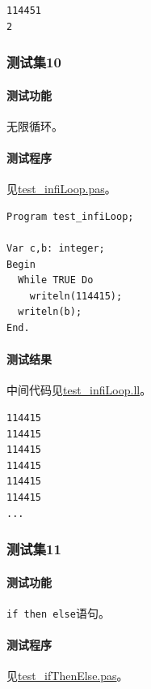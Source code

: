 \documentclass[lang=cn,11pt,a4paper,cite=authornum]{paper}
\begin{document}
\begin{code}
\begin{verbatim}
114451
2
\end{verbatim}
\end{code}

\subsubsection{测试集10}

\paragraph{测试功能} 无限循环。

\paragraph{测试程序} 见\href{run:../test/test_infiLoop.pas}{test\_infiLoop.pas}。

\begin{code}
\begin{verbatim}
Program test_infiLoop;

Var c,b: integer;
Begin
  While TRUE Do
    writeln(114415);
  writeln(b);
End.
\end{verbatim}
\end{code}

\paragraph{测试结果} 中间代码见\href{run:../test/test_infiLoop.ll}{test\_infiLoop.ll}。

\begin{code}
\begin{verbatim}
114415
114415
114415
114415
114415
114415
...
\end{verbatim}
\end{code}

\subsubsection{测试集11}

\paragraph{测试功能} \texttt{if then else}语句。

\paragraph{测试程序} 见\href{run:../test/test_ifThenElse.pas}{test\_ifThenElse.pas}。
\end{document}
